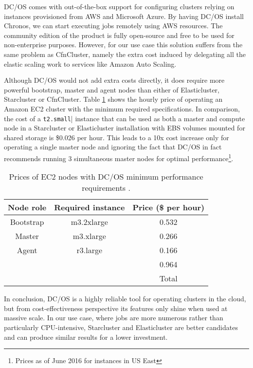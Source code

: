 DC/OS comes with out-of-the-box support for configuring clusters relying on instances provisioned from AWS and Microsoft Azure. By having DC/OS install Chronos, we can start executing jobs remotely using AWS resources. The community edition of the product is fully open-source and free to be used for non-enterprise purposes. However, for our use case this solution suffers from the same problem as CfnCluster, namely the extra cost induced by delegating all the elastic scaling work to services like Amazon Auto Scaling. 

Although DC/OS would not add extra costs directly, it does require more powerful bootstrap, master and agent nodes than either of Elasticluster, Starcluster or CfnCluster. Table \ref{DCOSPricing} shows the hourly price of operating an Amazon EC2 cluster with the minimum required specifications. In comparison, the cost of a \verb|t2.small|| instance that can be used as both a master and compute node in a Starcluster or Elasticluster installation with EBS volumes mounted for shared storage is \$0.026 per hour. This leads to a 10x cost increase only for operating a single master node and ignoring the fact that DC/OS in fact recommends running 3 simultaneous master nodes for optimal performance\footnote{Prices as of June 2016 for instances in US East}.

\begin{table}[h]
\centering
\begin{tabular}{ccc}
\textbf{Node role} & \textbf{Required instance} & \textbf{Price (\$ per hour)} \\ \hline
\multicolumn{1}{|c|}{Bootstrap} & \multicolumn{1}{c|}{m3.2xlarge} & \multicolumn{1}{c|}{0.532} \\ \hline
\multicolumn{1}{|c|}{Master} & \multicolumn{1}{c|}{m3.xlarge} & \multicolumn{1}{c|}{0.266} \\ \hline
\multicolumn{1}{|c|}{Agent} & \multicolumn{1}{c|}{r3.large} & \multicolumn{1}{c|}{0.166} \\ \hline
 & \multicolumn{1}{c|}{} & \multicolumn{1}{c|}{0.964} \\ \cline{3-3} 
 &  & Total
\end{tabular}
\caption{Prices of EC2 nodes with DC/OS minimum performance requirements \cite{DCOSReq, AWSPricing}.}
\label{DCOSPricing}
\end{table}

In conclusion, DC/OS is a highly reliable tool for operating clusters in the cloud, but from cost-effectiveness perspective its features only shine when used at massive scale. In our use case, where jobs are more numerous rather than particularly CPU-intensive, Starcluster and Elasticluster are better candidates and can produce similar results for a lower investment.